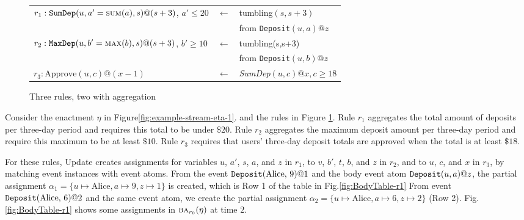 \begin{figure}[ht]
  \centering
  \begin{tabular}{lcl}
    $r_1: \mbox{\tt SumDep}(u,a'=\mbox{\sc sum}(a),s)@(s+3)$, $a'\leq 20$ & $\leftarrow$ & {\sc tumbling}$(s,s+3)$                  \\
                                                                          &              & {\sc from} \mbox{\tt Deposit}$(u,a)@z$   \\
    $r_2: \mbox{\tt MaxDep}(u,b'=\mbox{\sc max}(b),s)@(s+3)$, $b'\geq 10$ & $\leftarrow$ & {\sc tumbling}(s,s+3)                    \\
                                                                          &              & {\sc from} \mbox{\tt Deposit}$(u,b)@z$   \\
    $r_3: \mbox{Approve}(u,c)@(x-1)$                                  & $\leftarrow$ & {\em SumDep}$(u,c)@x, c \geq 18$         \\
    \end{tabular}
    \caption{Three rules, two with aggregation}
  \label{fig:aggregation-rules-3}
\end{figure}

\begin{examp}\label{examp:assignments}
Consider the enactment $\eta$ in Figure\:\ref{fig:example-stream-eta-1}.
and the rules in Figure \ref{fig:aggregation-rules-3}.
Rule $r_1$ aggregates the total amount of deposits
per three-day period
and requires this total to be under $\$20$.
Rule $r_2$ aggregates the maximum deposit amount per three-day period
and require this maximum to be at least $\$10$.
Rule $r_3$ requires that users' three-day deposit totals are approved
when the total is at least $\$18$.
  
For these rules,
{\sf Update} creates assignments for
variables $u$, $a'$, $s$, $a$, and $z$ in $r_1$,
to $v$, $b'$, $t$, $b$, and $z$ in $r_2$,
and 
to $u$, $c$, and $x$ in $r_3$,
by matching event instances with event atoms.
From the event $\mbox{\tt Deposit}(\mbox{Alice},\, 9)@1$
and the body event atom $\mbox{\tt Deposit}(u,a)@z$,
the partial assignment $\alpha_1 = \{u \mapsto \mbox{Alice}, a \mapsto 9, z \mapsto 1\}$ is created,
which is Row 1 of the table in Fig.\:\ref{fig:BodyTable-r1}
From event $\mbox{\tt Deposit}(\mbox{Alice},\, 6)@2$
and the same event atom,
we create the partial assignment $\alpha_2 = \{u \mapsto \mbox{Alice}, a \mapsto 6, z \mapsto 2\}$
(Row 2).
Fig.\:\ref{fig:BodyTable-r1}
shows some assignments in $\BODY/_{r_0}(\eta)$ at time $2$.
\end{examp}

